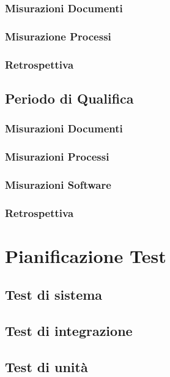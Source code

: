 \documentclass[a4paper, oneside, openany, dvipsnames, table]{article}
\begin{document}
		\subsubsection{Misurazioni Documenti}
			
		\subsubsection{Misurazione Processi}
			
		\subsubsection{Retrospettiva}
			

\newpage
	\subsection{Periodo di Qualifica}
		\subsubsection{Misurazioni Documenti}
			
		\subsubsection{Misurazioni Processi}
			
		\subsubsection{Misurazioni Software}
			
		\subsubsection{Retrospettiva}
			

\newpage
\section{Pianificazione Test}
\subsection{Test di sistema}
	
\subsection{Test di integrazione}
	
\subsection{Test di unità}
	
	
% 		
% 		
\end{document}
